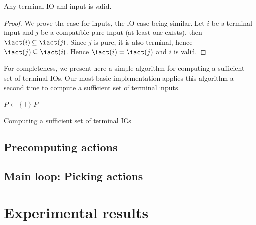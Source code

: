\documentclass[sigconf,screen]{acmart}
\begin{document}
\begin{proposition}
  Any terminal IO and input is valid.
\end{proposition}
\begin{proof}
  We prove the case for inputs, the IO case being similar.  Let \(i\) be a
  terminal input and \(j\) be a compatible pure input (at least one exists), then
  \(\iact(i) \subseteq \iact(j)\).  Since \(j\) is pure, it is also terminal, hence
  \(\iact(j) \subseteq \iact(i)\).  Hence \(\iact(i) = \iact(j)\) and \(i\) is valid.
\end{proof}


For completeness, we present here a simple algorithm for computing a sufficient
set of terminal IOs.  Our most basic implementation applies this algorithm a
second time to compute a sufficient set of terminal inputs.

\begin{algorithm}

\BlankLine
\(P \leftarrow \{\top\}\)\;
\Return \(P\)
\caption{Computing a sufficient set of terminal IOs}
\end{algorithm}



\subsection{Precomputing actions}

\subsection{Main loop: Picking actions}

\section{Experimental results}
\end{document}
